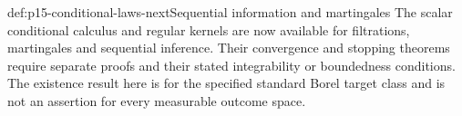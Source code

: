 \begin{proofboundary}{def:p15-conditional-laws-next}{Sequential information and martingales}
The scalar conditional calculus and regular kernels are now available for
filtrations, martingales and sequential inference. Their convergence and
stopping theorems require separate proofs and their stated integrability
or boundedness conditions. The existence result here is for the specified
standard Borel target class and is not an assertion for every measurable
outcome space.
\end{proofboundary}
